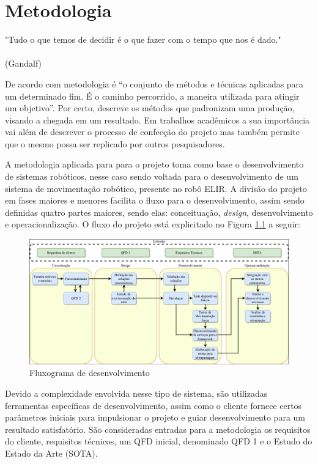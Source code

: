 \chapter{Metodologia}
\label{chap:meto}
\begin{flushright}
	"Tudo o que temos de decidir é o que fazer com o tempo que nos é dado." \\
	\ \\
	(Gandalf)
\end{flushright}

De acordo com \cite{maia} metodologia é “o conjunto de métodos e técnicas aplicadas para um determinado fim. É o caminho percorrido, a maneira utilizada para atingir um objetivo”. Por certo, descreve os métodos que padronizam uma produção, visando a chegada em um resultado. Em trabalhos acadêmicos a sua importância vai além de descrever o processo de confecção do projeto mas também permite que o mesmo possa ser replicado por outros pesquisadores.

A metodologia aplicada para para o projeto toma como base o desenvolvimento de sistemas robóticos, nesse caso sendo voltada para o desenvolvimento de um sistema de movimentação robótico, presente no robô ELIR. A divisão do projeto em fases maiores e menores facilita o fluxo para o desenvolvimento, assim sendo definidas quatro partes maiores, sendo elas: conceituação, \textit{design}, desenvolvimento e operacionalização. O fluxo do projeto está explicitado no Figura \ref{fig:flux_desen} a seguir: 


\begin{figure}[!htb]
	\centering
	\includegraphics[scale=0.45]{Figures/flux_desen.png}
	\caption{Fluxograma de desenvolvimento}
	\label{fig:flux_desen}
\end{figure}	

Devido a complexidade envolvida nesse tipo de sistema, são utilizadas ferramentas específicas de desenvolvimento, assim como o cliente fornece certos parâmetros iniciais para impulsionar o projeto e guiar desenvolvimento para um resultado satisfatório. São consideradas entradas para a metodologia os requisitos do cliente, requisitos técnicos, um QFD inicial, denominado QFD 1 e o Estudo do Estado da Arte (SOTA).



